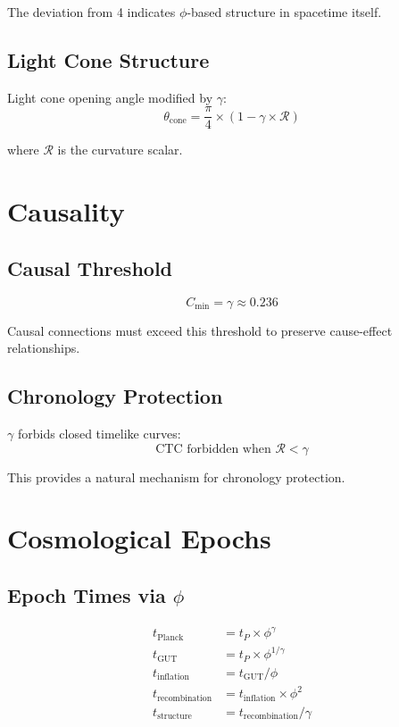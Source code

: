 \documentclass[12pt,a4paper]{article}
\begin{document}
The deviation from 4 indicates $\phi$-based structure in spacetime itself.

\subsection{Light Cone Structure}

Light cone opening angle modified by $\gamma$:
\begin{equation}
\theta_{\text{cone}} = \frac{\pi}{4} \times (1 - \gamma \times \mathcal{R})
\end{equation}

where $\mathcal{R}$ is the curvature scalar.

\section{Causality}

\subsection{Causal Threshold}

\begin{equation}
C_{\text{min}} = \gamma \approx 0.236
\end{equation}

Causal connections must exceed this threshold to preserve cause-effect relationships.

\subsection{Chronology Protection}

$\gamma$ forbids closed timelike curves:
\begin{equation}
\text{CTC forbidden when } \mathcal{R} < \gamma
\end{equation}

This provides a natural mechanism for chronology protection.

\section{Cosmological Epochs}

\subsection{Epoch Times via $\phi$}

\begin{align}
t_{\text{Planck}} &= t_P \times \phi^\gamma \\
t_{\text{GUT}} &= t_P \times \phi^{1/\gamma} \\
t_{\text{inflation}} &= t_{\text{GUT}} / \phi \\
t_{\text{recombination}} &= t_{\text{inflation}} \times \phi^2 \\
t_{\text{structure}} &= t_{\text{recombination}} / \gamma
\end{align}
\end{document}
